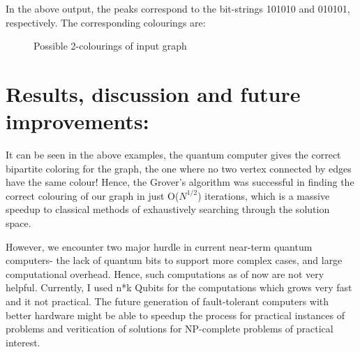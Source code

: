 \documentclass{article}
\begin{document}
In the above output, the peaks correspond to the bit-strings 101010 and 010101, respectively. The corresponding colourings are:

\begin{figure}[H]       
    \hspace{30px}
    \hspace{30px}
    \caption{Possible 2-colourings of input graph}
\end{figure}

\section{Results, discussion and future improvements:}

It can be seen in the above examples, the quantum computer gives the correct bipartite coloring for the graph, the one where no two vertex connected by edges have the same colour! Hence, the Grover's algorithm was successful in finding the correct colouring of our graph in just O($N^{1/2}$) iterations, which is a massive speedup to classical methods of exhaustively searching through the solution space.

However, we encounter two major hurdle in current near-term quantum computers- the lack of quantum bits to support more complex cases, and large computational overhead. Hence, such computations as of now are not very helpful. Currently, I used n*k Qubits for the computations which grows very fast and it not practical. The future generation of fault-tolerant computers with better hardware might be able to speedup the process for practical instances of problems and veritication of solutions for NP-complete problems of practical interest.
\end{document}
